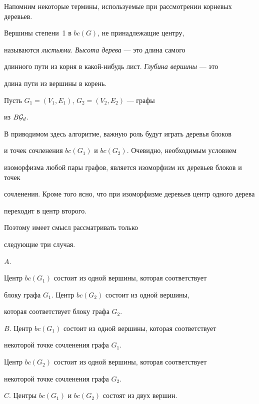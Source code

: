 Напомним некоторые термины, используемые при рассмотрении корневых деревьев.


Вершины степени~1 в $bc(G)$, не принадлежащие центру,


называются {\em листьями}. {\it Высота дерева} --- это длина самого


длинного пути из корня в какой-нибудь лист. {\it Глубина вершины} --- это


длина пути из вершины в корень.





Пусть $G_1=(V_1, E_1)$, $G_2=(V_2, E_2)$ --- графы


из $B{\cal G}_d$.


В приводимом здесь алгоритме, важную роль будут играть деревья блоков


и точек сочленения $bc(G_1)$ и $bc(G_2)$. Очевидно, необходимым условием


изоморфизма любой пары графов, является изоморфизм их деревьев блоков и точек


сочленения. Кроме того ясно, что при изоморфизме деревьев центр одного дерева


переходит в центр второго.


Поэтому имеет смысл рассматривать только


следующие три случая.





$A$. \label{ABC_letter}


Центр $bc(G_1)$ состоит из одной вершины, которая соответствует


блоку графа $G_1$. Центр $bc(G_2)$ состоит из одной вершины,


которая соответствует блоку графа $G_2$.





$B$. Центр $bc(G_1)$ состоит из одной вершины, которая соответствует


некоторой точке сочленения графа $G_1$.


Центр $bc(G_2)$ состоит из одной вершины, которая соответствует


некоторой точке сочленения графа $G_2$.





$C$. Центры $bc(G_1)$ и $bc(G_2)$ состоят из двух вершин.





